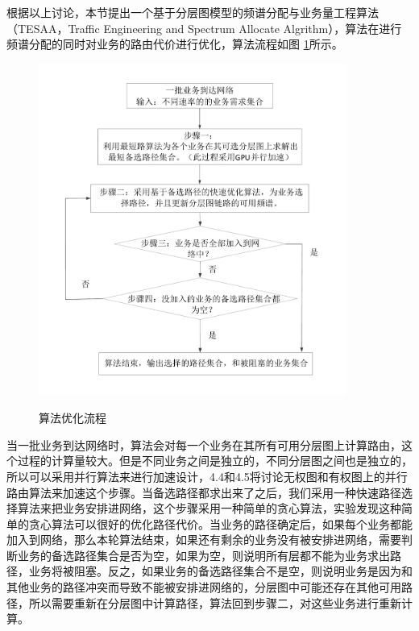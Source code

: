 根据以上讨论，本节提出一个基于分层图模型的频谱分配与业务量工程算法（TESAA，Traffic Engineering and Spectrum Allocate Algrithm），算法在进行频谱分配的同时对业务的路由代价进行优化，算法流程如图 \ref{bblayer}所示。
\begin{figure}
\vspace{-1cm}
\setlength{\abovecaptionskip}{-0.5cm}
\begin{center}
{\includegraphics[width=0.9\textwidth]{figures/bbprocess.pdf}}
\end{center}
\caption{{\footnotesize{算法优化流程}}}
\label{bblayer}
\end{figure}

当一批业务到达网络时，算法会对每一个业务在其所有可用分层图上计算路由，这个过程的计算量较大。但是不同业务之间是独立的，不同分层图之间也是独立的，所以可以采用并行算法来进行加速设计，4.4和4.5将讨论无权图和有权图上的并行路由算法来加速这个步骤。当备选路径都求出来了之后，我们采用一种快速路径选择算法来把业务安排进网络，这个步骤采用一种简单的贪心算法，实验发现这种简单的贪心算法可以很好的优化路径代价。当业务的路径确定后，如果每个业务都能加入到网络，那么本轮算法结束，如果还有剩余的业务没有被安排进网络，需要判断业务的备选路径集合是否为空，如果为空，则说明所有层都不能为业务求出路径，业务将被阻塞。反之，如果业务的备选路径集合不是空，则说明业务是因为和其他业务的路径冲突而导致不能被安排进网络的，分层图中可能还存在其他可用路径，所以需要重新在分层图中计算路径，算法回到步骤二，对这些业务进行重新计算。


